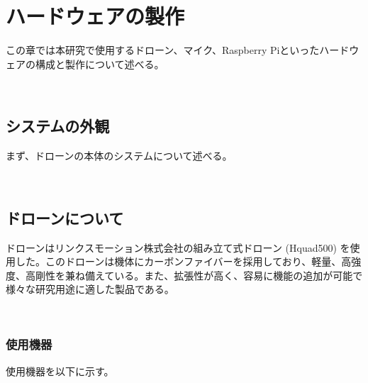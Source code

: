 \chapter{ハードウェアの製作}\label{hardware}

この章では本研究で使用するドローン、マイク、Raspberry
Piといったハードウェアの構成と製作について述べる。

\
\section{システムの外観}\label{system-overview}

まず、ドローンの本体のシステムについて述べる。

\
\section{ドローンについて}\label{about-drone}

ドローンはリンクスモーション株式会社の組み立て式ドローン (Hquad500)
を使用した。このドローンは機体にカーボンファイバーを採用しており、軽量、高強度、高剛性を兼ね備えている。また、拡張性が高く、容易に機能の追加が可能で様々な研究用途に適した製品である。

\
\subsection{使用機器}\label{used-equipments-drone}

使用機器を以下に示す。

